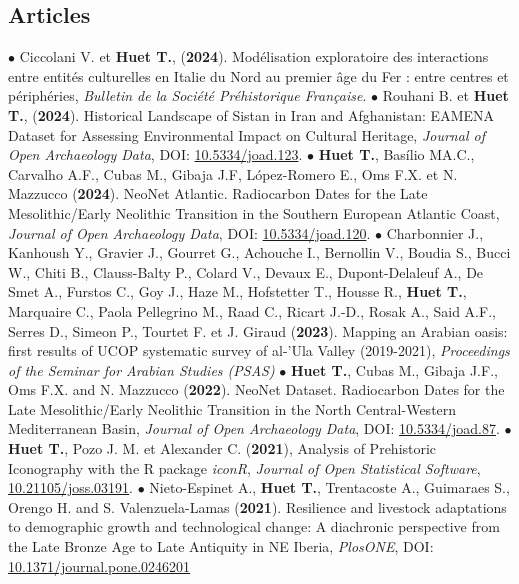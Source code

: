 \documentclass{article}
\newcommand{\fr}[1]{#1}       %
\newcommand{\en}[1]{}     %
\begin{document}
\subsection*{\fr{Articles}\en{Articles}}
$\bullet$ Ciccolani V. et \textbf{Huet T.}, (\textbf{2024}). Modélisation exploratoire des interactions entre entités culturelles en Italie du Nord au premier âge du Fer : entre centres et périphéries, \textit{Bulletin de la Soci\'{e}t\'{e} Pr\'{e}historique Fran\c{c}aise}.
\smallbreak
$\bullet$ Rouhani B. et \textbf{Huet T.}, (\textbf{2024}). Historical Landscape of Sistan in Iran and Afghanistan: EAMENA Dataset for Assessing Environmental Impact on Cultural Heritage, \textit{Journal of Open Archaeology Data}, DOI: \href{https://openarchaeologydata.metajnl.com/articles/10.5334/joad.123}{10.5334/joad.123}.
\smallbreak
$\bullet$ \textbf{Huet T.}, Basílio MA.C., Carvalho A.F., Cubas M., Gibaja J.F, López-Romero E., Oms F.X. et N. Mazzucco (\textbf{2024}). NeoNet Atlantic. Radiocarbon Dates for the Late Mesolithic/Early Neolithic Transition in the Southern European Atlantic Coast, \textit{Journal of Open Archaeology Data}, DOI: \href{https://openarchaeologydata.metajnl.com/articles/10.5334/joad.120}{10.5334/joad.120}.
\smallbreak
$\bullet$ Charbonnier J., Kanhoush Y., Gravier J., Gourret G., Achouche I., Bernollin V., Boudia S., Bucci W., Chiti B., Clauss-Balty P., Colard V., Devaux E., Dupont-Delaleuf A., De Smet A., Furstos C., Goy J., Haze M., Hofstetter T., Housse R., \textbf{Huet T.}, Marquaire C., Paola Pellegrino M., Raad C., Ricart J.-D., Rosak A., Said A.F., Serres D., Simeon P., Tourtet F. et J. Giraud (\textbf{2023}). Mapping an Arabian oasis: first results of UCOP systematic survey of al-'Ula Valley (2019-2021), \textit{Proceedings of the Seminar for Arabian Studies (PSAS)}
\smallbreak
$\bullet$ \textbf{Huet T.}, Cubas M., Gibaja J.F., Oms F.X. and N. Mazzucco (\textbf{2022}). NeoNet Dataset. Radiocarbon Dates for the Late Mesolithic/Early Neolithic Transition in the North Central-Western Mediterranean Basin, \textit{Journal of Open Archaeology Data}, DOI: \href{http://doi.org/10.5334/joad.87}{10.5334/joad.87}.
\smallbreak
$\bullet$ \textbf{Huet T.}, Pozo J. M. et Alexander C. (\textbf{2021}), Analysis of Prehistoric Iconography with the R package \textit{iconR}, \textit{Journal of Open Statistical Software}, \href{https://joss.theoj.org/papers/10.21105/joss.03191}{10.21105/joss.03191}.
\smallbreak
$\bullet$ Nieto-Espinet A., \textbf{Huet T.}, Trentacoste A., Guimaraes S., Orengo H. and S. Valenzuela-Lamas (\textbf{2021}). Resilience and livestock adaptations to demographic growth and technological change: A diachronic perspective from the Late Bronze Age to Late Antiquity in NE Iberia, \textit{PlosONE}, DOI: \href{https://doi.org/10.1371/journal.pone.0246201}{10.1371/journal.pone.0246201}
\end{document}
